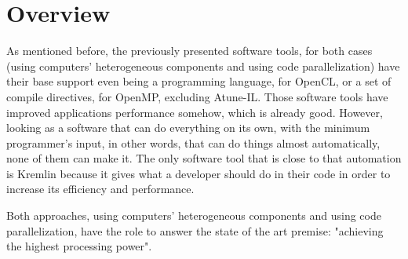 \section{Overview}

As mentioned before, the previously presented software tools, for both cases (using computers' heterogeneous components and using code parallelization) have their base support even being a programming language, for OpenCL, or a set of compile directives, for OpenMP, excluding Atune-IL. Those software tools have improved applications performance somehow, which is already good. However, looking as a software that can do everything on its own, with the minimum programmer's input, in other words, that can do things almost automatically, none of them can make it. The only software tool that is close to that automation is Kremlin because it gives what a developer should do in their code in order to increase its efficiency and performance.

Both approaches, using computers' heterogeneous components and using code parallelization, have the role to answer the state of the art premise: "achieving the highest processing power".  
